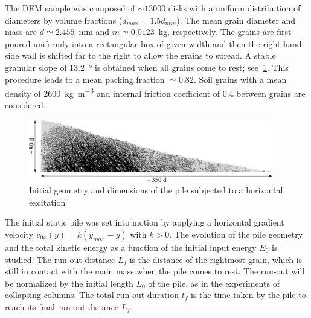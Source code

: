 The DEM sample was composed of $\sim13000$ disks with a uniform distribution of 
diameters by volume fractions ($d_{max} = 1.5 d_{min}$). The mean grain 
diameter and mass are $d\simeq 2.455 $~\si{\mm} and $m\simeq 0.0123$~\si{\kg}, 
respectively. The grains are first poured uniformly into a rectangular box of 
given width and then the right-hand side wall is shifted far to the right 
to allow the grains to spread. A stable granular slope of 13.2~\si{\degree} is 
obtained when all grains come to rest; see~\cref{fig:slope_configuration}. This 
procedure leads to a mean packing fraction $\simeq 0.82$. Soil grains with a 
mean density of 2600~\si{\kg\per\m\cubed} and internal friction coefficient of 
0.4 between grains are considered.

\begin{figure}[tbhp]
\includegraphics[width=0.95\textwidth]{slope_configuration}
\caption{Initial geometry and dimensions of the pile subjected to a horizontal 
excitation}
\label{fig:slope_configuration}
\end{figure}


The initial static pile was set into motion by applying a horizontal
gradient velocity $v_{0x}(y) = k (y_{max} - y)$ with $k>0$. The evolution of 
the pile geometry and the total kinetic energy as a function of the initial 
input energy $E_0$ is studied. The run-out distance $L_f$ is the distance of 
the rightmost grain, which is still in contact with the main mass when the pile 
comes to rest. The run-out will be normalized by the initial length $L_0$ of 
the pile, as in the experiments of collapsing columns. The total run-out 
duration $t_f$ is the time taken by the pile to reach its final run-out 
distance $L_f$.

